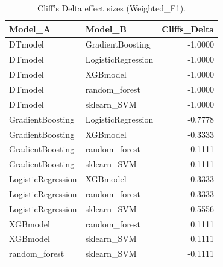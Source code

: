 \begin{table}[t]
\centering
\begin{tabular}{llr}
\toprule
Model_A & Model_B & Cliffs_Delta \\
\midrule
DTmodel & GradientBoosting & -1.0000 \\
DTmodel & LogisticRegression & -1.0000 \\
DTmodel & XGBmodel & -1.0000 \\
DTmodel & random_forest & -1.0000 \\
DTmodel & sklearn_SVM & -1.0000 \\
GradientBoosting & LogisticRegression & -0.7778 \\
GradientBoosting & XGBmodel & -0.3333 \\
GradientBoosting & random_forest & -0.1111 \\
GradientBoosting & sklearn_SVM & -0.1111 \\
LogisticRegression & XGBmodel & 0.3333 \\
LogisticRegression & random_forest & 0.3333 \\
LogisticRegression & sklearn_SVM & 0.5556 \\
XGBmodel & random_forest & 0.1111 \\
XGBmodel & sklearn_SVM & 0.1111 \\
random_forest & sklearn_SVM & -0.1111 \\
\bottomrule
\end{tabular}
\caption{Cliff's Delta effect sizes (Weighted_F1).}
\label{tab:cliffs_Weighted_F1}
\end{table}
